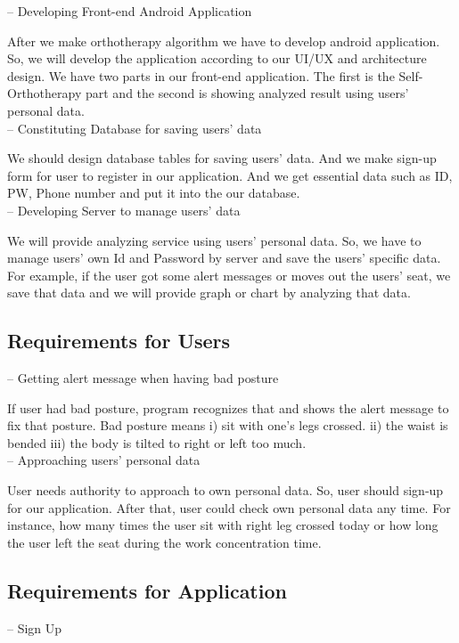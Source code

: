 \documentclass[conference]{IEEEtran}
\begin{document}
-- Developing  Front-end Android Application

After we make orthotherapy algorithm we have to develop 
android application. So, we will develop the application according to our UI/UX and architecture design. We have two parts in our front-end application. The first is the Self-Orthotherapy part and the second is showing analyzed result using users' personal data.\\

-- Constituting Database for saving users' data

We should design database tables for saving users' data.
And we make sign-up form for user to register in our application. And we get essential data such as ID, PW, Phone number and put it into the our database. \\

-- Developing  Server to manage users' data

We will provide analyzing service using users' personal data. So, we have to manage users' own Id and Password by server and save the users' specific data. For example, if the user got some alert messages or moves out the users' seat, we save that data and we will provide graph or chart by analyzing that data.\\

\subsection{Requirements for Users}
-- Getting alert message when having bad posture

If user had bad posture, program recognizes that and shows the alert message to fix that posture.  Bad posture means i) sit with one's legs crossed. ii) the waist is bended iii) the body is tilted to right or left too much.\\

-- Approaching users' personal data

User needs authority to approach to own personal data. So, user should sign-up for our application. After that, user could check own personal data any time. For instance, how many times the user sit with right leg crossed today or how long the user left the seat during the work concentration time.\\

\subsection{Requirements for Application}
-- Sign Up
\end{document}
